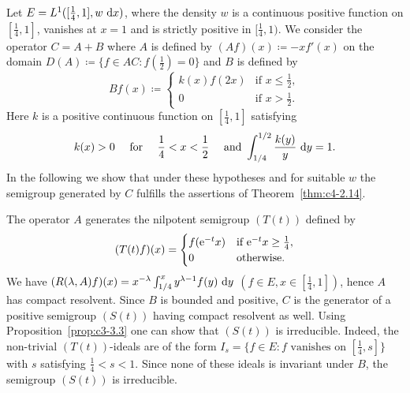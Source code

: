 \begin{example}\label{ex:c4-2.15}
Let $E = L^{1}([\frac{1}{4},1],w\,\mathop{}\!\mathrm{d}{x})$, where the density $w$ is a continuous positive function on $[\frac{1}{4},1]$, vanishes at $x = 1$ and is strictly positive in $[\frac{1}{4},1)$.
We consider the operator $C = A + B$ where $A$ is defined by $(Af)(x) \coloneq  -xf'(x)$ on the domain $D(A) \coloneqq \{f \in AC \colon f(\frac{1}{2}) = 0\}$ and $B$ is defined by
\begin{equation*}\label{eq:c4-2.12-kgk}
Bf(x) \coloneqq \begin{cases}
    k(x)f(2x) & \text{if } x \leq \frac{1}{2}, \\
    0 & \text{if } x > \frac{1}{2}.
\end{cases}
\end{equation*}
Here $k$ is a positive continuous function on $[\frac{1}{4},1]$ satisfying
\begin{equation}\label{eq:c4-2.13}
k(x) > 0 \quad \text{ for } \quad \frac{1}{4} < x < \frac{1}{2} \quad \text{ and }  \int_{1/4}^{1/2} \frac{k(y)}{y} \, \mathop{}\!\mathrm{d}{y} = 1.
\end{equation}
In the following we show that under these hypotheses and for suitable $w$ the semigroup generated by $C$ fulfills the assertions of Theorem~\ref{thm:c4-2.14}.

The operator $A$ generates the nilpotent semigroup $(T(t))$ defined by
\begin{equation*}\label{eq:c4-2.13-kgk}
(T(t)f)(x) = \begin{cases}
    f(\eu^{-t}x) & \text{if } \eu^{-t}x \geq \frac{1}{4}, \\
    0 & \text{otherwise}.
\end{cases}
\end{equation*}
We have $(R(\lambda,A)f)(x) = x^{-\lambda}\int_{1/4}^{x} y^{\lambda-1}f(y) \, \mathop{}\!\mathrm{d}{y}$ $(f \in E, x \in [\frac{1}{4},1])$, hence $A$ has compact resolvent.
Since $B$ is bounded and positive, $C$ is the generator of a positive semigroup $(S(t))$ having compact resolvent as well.
Using Proposition~\ref{prop:c3-3.3}  one can show that $(S(t))$ is irreducible.
Indeed, the non-trivial $(T(t))$-ideals are of the form $I_{s} = \{f \in E \colon f \text{ vanishes on } [\frac{1}{4},s]\}$ with $s$ satisfying $\frac{1}{4} < s < 1$.
Since none of these ideals is invariant under $B$, the semigroup $(S(t))$ is irreducible.


\end{example}

